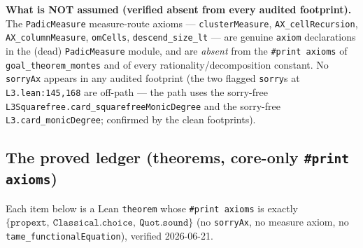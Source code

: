 \documentclass[11pt]{article}
\theoremstyle{definition}
\theoremstyle{remark}
\begin{document}
\noindent\textbf{What is NOT assumed (verified absent from every audited footprint).}
The \texttt{PadicMeasure} measure-route axioms ---
\texttt{clusterMeasure}, \texttt{AX\_cellRecursion}, \texttt{AX\_columnMeasure},
\texttt{omCells}, \texttt{descend\_size\_lt} --- are genuine \texttt{axiom}
declarations in the (dead) \texttt{PadicMeasure} module, and are \emph{absent} from
the \texttt{\#print axioms} of \texttt{goal\_theorem\_montes} and of every
rationality/decomposition constant. No \texttt{sorryAx} appears in any audited
footprint (the two flagged \texttt{sorry}s at \texttt{L3.lean:145,168} are off-path
--- the path uses the sorry-free \texttt{L3Squarefree.card\_squarefreeMonicDegree}
and the sorry-free \texttt{L3.card\_monicDegree}; confirmed by the clean footprints).

\subsection{The proved ledger (theorems, core-only \texttt{\#print axioms})}\label{sec:proved}

Each item below is a Lean \texttt{theorem} whose \texttt{\#print axioms} is exactly
$\{\texttt{propext},\ \texttt{Classical.choice},\ \texttt{Quot.sound}\}$ (no
\texttt{sorryAx}, no measure axiom, no \texttt{tame\_functionalEquation}), verified
2026-06-21.
\end{document}

